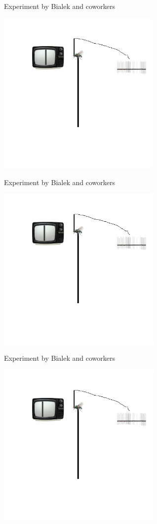 \documentclass{beamer}
\begin{document}
\begin{frame}{Experiment by Bialek and coworkers}
  \begin{center}
    \includegraphics[width=8cm]{experiment6.jpg}
  \end{center}
\end{frame}

\begin{frame}{Experiment by Bialek and coworkers}
  \begin{center}
    \includegraphics[width=8cm]{experiment3.jpg}
  \end{center}
\end{frame}


\begin{frame}{Experiment by Bialek and coworkers}
  \begin{center}
    \includegraphics[width=8cm]{experiment7.jpg}
  \end{center}
\end{frame}
\end{document}
